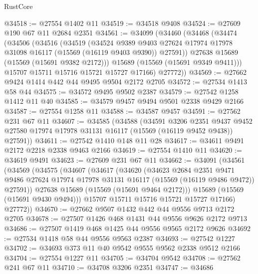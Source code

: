 \begin{lexlean}{RustCore}
\begin{coremodule}
@34518 := @27554 @1402 @11
@34519 := @34518 @9408
@34524 := @27609 @190 @67 @11 @2684 @2351
@34561 := @34099
    (@34460
      (@34468
        (@34474
          (@34506
            (@34516
              (@34519
                (@34524
                  @9389
                  @9403
                  @27624
                  @17974
                  @17978
                  @31098
                  @16117
                  (@15569 (@16119 @9403 @9390))
                  @27591))
              @27638
              @15689
              (@15569 (@15691 @9382 @2172)))
            @15689
            (@15569 (@15691 @9349 @9411)))
          @15707
          @15711
          @15716
          @15721
          @15727
          @17166)
        @27772))
@34569 := @27662 @9424 @1414 @442 @44 @9495 @9504 @2172 @2705
@34572 := @27534 @1413 @58 @44
@34575 := @34572 @9495 @9502 @2387
@34579 := @27542 @1258 @1412 @11 @40
@34585 := @34579 @9457 @9494 @9501 @2338 @9429 @2166
@34587 := @27554 @1258 @11
@34588 := @34587 @9457
@34591 := @27562 @231 @67 @11
@34607 := @34585
    (@34588
      (@34591
        @3206
        @2351
        @9437
        @9452
        @27580
        @17974
        @17978
        @31131
        @16117
        (@15569 (@16119 @9452 @9438))
        @27591))
@34611 := @27542 @1410 @148 @11 @28
@34617 := @34611 @9491 @2172 @2218 @2338 @9463 @2166
@34619 := @27554 @1410 @11
@34620 := @34619 @9491
@34623 := @27609 @231 @67 @11
@34662 := @34091
    (@34561
      (@34569
        (@34575
          (@34607
            (@34617
              (@34620
                (@34623
                  @2684
                  @2351
                  @9471
                  @9486
                  @27624
                  @17974
                  @17978
                  @31131
                  @16117
                  (@15569 (@16119 @9486 @9472))
                  @27591))
              @27638
              @15689
              (@15569 (@15691 @9464 @2172)))
            @15689
            (@15569 (@15691 @9430 @9494)))
          @15707
          @15711
          @15716
          @15721
          @15727
          @17166)
        @27772))
@34670 := @27662 @9507 @1432 @442 @44 @9556 @9713 @2172 @2705
@34678 := @27507 @1426 @468 @1431 @44 @9556 @9626 @2172 @9713
@34686 := @27507 @1419 @468 @1425 @44 @9556 @9565 @2172 @9626
@34692 := @27534 @1418 @58 @44 @9556 @9563 @2387
@34693 := @27542 @1227
@34702 := @34693 @373 @11 @40 @9542 @9555 @9562 @2338 @9512 @2166
@34704 := @27554 @1227 @11
@34705 := @34704 @9542
@34708 := @27562 @241 @67 @11
@34710 := @34708 @3206 @2351
@34747 := @34686

\end{coremodule}
\end{lexlean}
